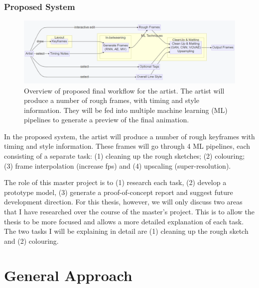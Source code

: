 \subsubsection{Proposed System}

\begin{figure}
    \centering
    \includegraphics[width=1\textwidth]{images/introduction/proposed_workflow.png}
    \caption[Overview of proposed final workflow for the artist.]{Overview of proposed final workflow for the artist. The artist will produce a number of rough frames, with timing and style information. They will be fed into multiple machine learning (ML) pipelines to generate a preview of the final animation.} 
    \label{fig:proposed_worflow}
\end{figure}

In the proposed system, the artist will produce a number of rough keyframes with timing and style information. These frames will go through 4 ML pipelines, each consisting of a separate task: (1) cleaning up the rough sketches; (2) colouring; (3) frame interpolation (increase fps) and (4) upscaling (super-resolution).

The role of this master project is to (1) research each task, (2) develop a prototype model, (3) generate a proof-of-concept report and suggest future development direction. For this thesis, however, we will only discuss two areas that I have researched over the course of the master's project. This is to allow the thesis to be more focused and allows a more detailed explanation of each task. The two tasks I will be explaining in detail are (1) cleaning up the rough sketch and (2) colouring.


\section{General Approach}

